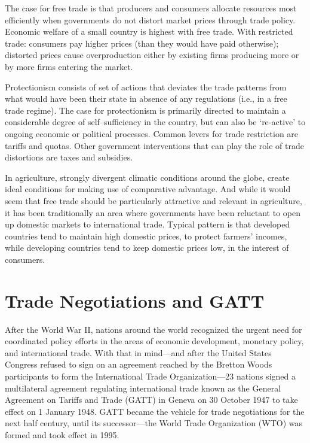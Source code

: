 \documentclass[
]{book}
\begin{document}
The case for free trade is that producers and consumers allocate resources most efficiently when governments do not distort market prices through trade policy. Economic welfare of a small country is highest with free trade. With restricted trade: consumers pay higher prices (than they would have paid otherwise); distorted prices cause overproduction either by existing firms producing more or by more firms entering the market.

Protectionism consists of set of actions that deviates the trade patterns from what would have been their state in absence of any regulations (i.e., in a free trade regime). The case for protectionism is primarily directed to maintain a considerable degree of self--sufficiency in the country, but can also be `re-active' to ongoing economic or political processes. Common levers for trade restriction are tariffs and quotas. Other government interventions that can play the role of trade distortions are taxes and subsidies.

In agriculture, strongly divergent climatic conditions around the globe, create ideal conditions for making use of comparative advantage. And while it would seem that free trade should be particularly attractive and relevant in agriculture, it has been traditionally an area where governments have been reluctant to open up domestic markets to international trade. Typical pattern is that developed countries tend to maintain high domestic prices, to protect farmers' incomes, while developing countries tend to keep domestic prices low, in the interest of consumers.

\hypertarget{trade-negotiations-and-gatt}{%
\section{Trade Negotiations and GATT}\label{trade-negotiations-and-gatt}}

After the World War II, nations around the world recognized the urgent need for coordinated policy efforts in the areas of economic development, monetary policy, and international trade. With that in mind---and after the United States Congress refused to sign on an agreement reached by the Bretton Woods participants to form the International Trade Organization---23 nations signed a multilateral agreement regulating international trade known as the General Agreement on Tariffs and Trade (GATT) in Geneva on 30 October 1947 to take effect on 1 January 1948. GATT became the vehicle for trade negotiations for the next half century, until its successor---the World Trade Organization (WTO) was formed and took effect in 1995.
\end{document}
